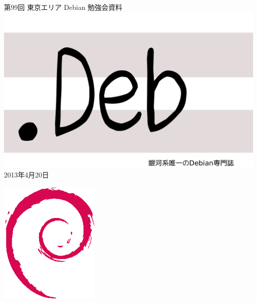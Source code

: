 \documentclass[mingoth,a4paper]{jsarticle}
\newcommand{\debmtgyear}{2013}
\newcommand{\debmtgmonth}{4}
\newcommand{\debmtgdate}{20}
\newcommand{\debmtgnumber}{99}
\begin{document}
\begin{titlepage}
\thispagestyle{empty}

\vspace*{-2cm}
第\debmtgnumber{}回 東京エリア Debian 勉強会資料\\
\hspace*{-2cm}
\includegraphics{image2012-natsu/dotdeb.pdf}\\
\hfill{}\debmtgyear{}年\debmtgmonth{}月\debmtgdate{}日



\vspace*{-2cm}
\hfill{}\includegraphics[height=6cm]{image200502/openlogo-nd.eps}
\end{titlepage}

\end{document}
